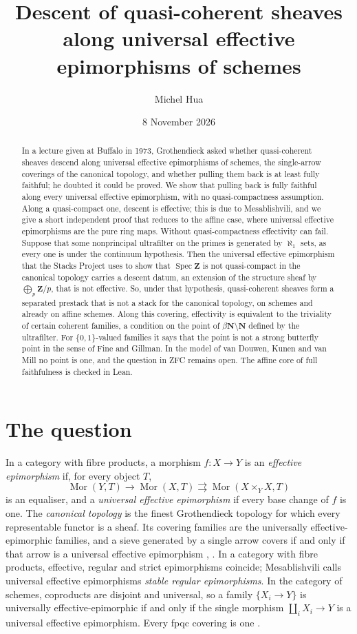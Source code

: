 \documentclass[11pt,a4paper]{amsart}
\title[Descent along universal effective epimorphisms]{Descent of quasi-coherent sheaves\\ along universal effective epimorphisms of schemes}
\author{Michel Hua}
\date{8 November 2026}
\theoremstyle{definition}
\theoremstyle{remark}
\newcommand{\Z}{\mathbf Z}
\newcommand{\Spec}{\operatorname{Spec}}
\newcommand{\Mor}{\operatorname{Mor}}
\begin{document}
\begin{abstract}
In a lecture given at Buffalo in 1973, Grothendieck asked whether quasi-coherent sheaves descend along universal effective epimorphisms of schemes, the single-arrow coverings of the canonical topology, and whether pulling them back is at least fully faithful; he doubted it could be proved. We show that pulling back is fully faithful along every universal effective epimorphism, with no quasi-compactness assumption. Along a quasi-compact one, descent is effective; this is due to Mesablishvili, and we give a short independent proof that reduces to the affine case, where universal effective epimorphisms are the pure ring maps. Without quasi-compactness effectivity can fail. Suppose that some nonprincipal ultrafilter on the primes is generated by $\aleph_1$ sets, as every one is under the continuum hypothesis. Then the universal effective epimorphism that the Stacks Project uses to show that $\Spec\Z$ is not quasi-compact in the canonical topology carries a descent datum, an extension of the structure sheaf by $\bigoplus_p\Z/p$, that is not effective. So, under that hypothesis, quasi-coherent sheaves form a separated prestack that is not a stack for the canonical topology, on schemes and already on affine schemes. Along this covering, effectivity is equivalent to the triviality of certain coherent families, a condition on the point of $\beta\mathbf N\setminus\mathbf N$ defined by the ultrafilter. For $\{0,1\}$-valued families it says that the point is not a strong butterfly point in the sense of Fine and Gillman. In the model of van Douwen, Kunen and van Mill no point is one, and the question in ZFC remains open. The affine core of full faithfulness is checked in Lean.
\end{abstract}
\maketitle

\section{The question}

In a category with fibre products, a morphism $f\colon X\to Y$ is an \emph{effective epimorphism} if, for every object $T$,
\[
\Mor(Y,T)\to\Mor(X,T)\rightrightarrows\Mor(X\times_YX,T)
\]
is an equaliser, and a \emph{universal effective epimorphism} if every base change of $f$ is one. The \emph{canonical topology} is the finest Grothendieck topology for which every representable functor is a sheaf. Its covering families are the universally effective-epimorphic families, and a sieve generated by a single arrow covers if and only if that arrow is a universal effective epimorphism \cite[00WP, 00ZA]{stacks}, \cite[\S1.2]{af}. In a category with fibre products, effective, regular and strict epimorphisms coincide; Mesablishvili calls universal effective epimorphisms \emph{stable regular epimorphisms}. In the category of schemes, coproducts are disjoint and universal, so a family $\{X_i\to Y\}$ is universally effective-epimorphic if and only if the single morphism $\coprod_iX_i\to Y$ is a universal effective epimorphism. Every fpqc covering is one \cite[023Q]{stacks}.
\end{document}
